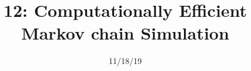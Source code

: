 \documentclass{beamer}
\title["12"]{12: Computationally Efficient Markov chain Simulation}
\date{11/18/19}
\begin{document}

\begin{frame}
\titlepage 
\end{frame}












\end{document}
